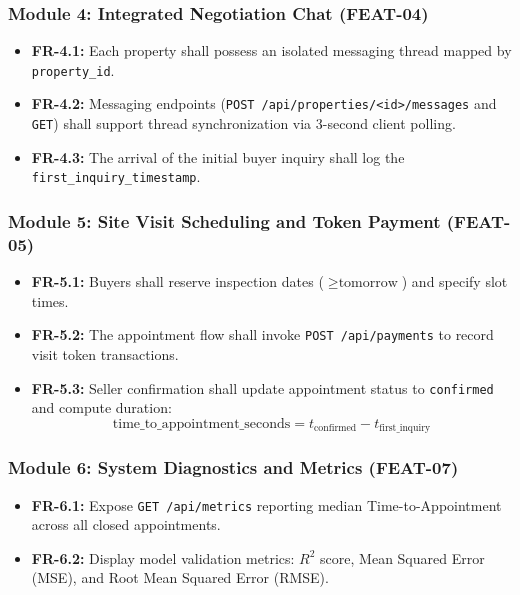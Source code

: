 \documentclass[11pt,a4paper]{article}
\begin{document}
\subsubsection{Module 4: Integrated Negotiation Chat (FEAT-04)}
\begin{itemize}[leftmargin=0.8cm]
    \item \textbf{FR-4.1:} Each property shall possess an isolated messaging thread mapped by \texttt{property\_id}.
    \item \textbf{FR-4.2:} Messaging endpoints (\texttt{POST /api/properties/<id>/messages} and \texttt{GET}) shall support thread synchronization via 3-second client polling.
    \item \textbf{FR-4.3:} The arrival of the initial buyer inquiry shall log the \texttt{first\_inquiry\_timestamp}.
\end{itemize}

\subsubsection{Module 5: Site Visit Scheduling and Token Payment (FEAT-05)}
\begin{itemize}[leftmargin=0.8cm]
    \item \textbf{FR-5.1:} Buyers shall reserve inspection dates ($\ge \text{tomorrow}$) and specify slot times.
    \item \textbf{FR-5.2:} The appointment flow shall invoke \texttt{POST /api/payments} to record visit token transactions.
    \item \textbf{FR-5.3:} Seller confirmation shall update appointment status to \texttt{confirmed} and compute duration:
    $$\text{time\_to\_appointment\_seconds} = t_{\text{confirmed}} - t_{\text{first\_inquiry}}$$
\end{itemize}

\subsubsection{Module 6: System Diagnostics and Metrics (FEAT-07)}
\begin{itemize}[leftmargin=0.8cm]
    \item \textbf{FR-6.1:} Expose \texttt{GET /api/metrics} reporting median Time-to-Appointment across all closed appointments.
    \item \textbf{FR-6.2:} Display model validation metrics: $R^2$ score, Mean Squared Error (MSE), and Root Mean Squared Error (RMSE).
\end{itemize}
\end{document}
